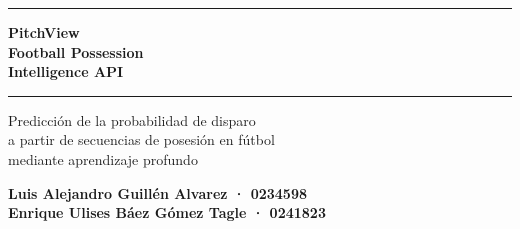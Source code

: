\documentclass[12pt,a4paper]{article}
\begin{document}
\begin{titlepage}
    \centering
    \vspace*{1.2cm}

    {\color{primary}\rule{\linewidth}{2pt}\par}
    \vspace{0.6cm}

    {\fontsize{32}{38}\selectfont\bfseries\color{primary}
     PitchView\\[0.2em]
     Football Possession\\[0.2em]
     Intelligence API\par}

    \vspace{0.5cm}
    {\color{primary}\rule{\linewidth}{0.8pt}\par}
    \vspace{0.8cm}

    {\large\color{neutral}
     Predicción de la probabilidad de disparo\\[0.2em]
     a partir de secuencias de posesión en fútbol\\[0.2em]
     mediante aprendizaje profundo\par}

    \vspace{1cm}
    {\large\bfseries\color{neutral}
     Luis Alejandro Guillén Alvarez \normalfont\textcolor{neutral}{· 0234598}\\[0.3em]
     \bfseries Enrique Ulises Báez Gómez Tagle \normalfont\textcolor{neutral}{· 0241823}\par}

    \vspace{0.8cm}


\end{titlepage}
\end{document}
